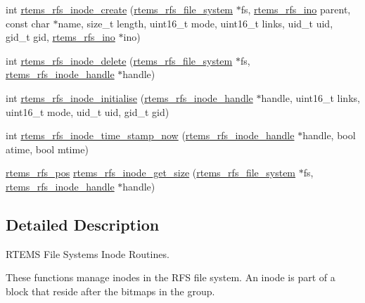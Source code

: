 \begin{DoxyCompactItemize}
\item 
int \mbox{\hyperlink{rtems-rfs-inode_8c_a84fd42caa1f9dada5918fbb1e42c7978}{rtems\+\_\+rfs\+\_\+inode\+\_\+create}} (\mbox{\hyperlink{struct__rtems__rfs__file__system}{rtems\+\_\+rfs\+\_\+file\+\_\+system}} $\ast$fs, \mbox{\hyperlink{rtems-rfs-inode_8h_ae658325c3ff9941f2e68315d20e3c723}{rtems\+\_\+rfs\+\_\+ino}} parent, const char $\ast$name, size\+\_\+t length, uint16\+\_\+t mode, uint16\+\_\+t links, uid\+\_\+t uid, gid\+\_\+t gid, \mbox{\hyperlink{rtems-rfs-inode_8h_ae658325c3ff9941f2e68315d20e3c723}{rtems\+\_\+rfs\+\_\+ino}} $\ast$ino)
\item 
int \mbox{\hyperlink{rtems-rfs-inode_8c_a4630b6fa02927ccf6cbe2205824ccc75}{rtems\+\_\+rfs\+\_\+inode\+\_\+delete}} (\mbox{\hyperlink{struct__rtems__rfs__file__system}{rtems\+\_\+rfs\+\_\+file\+\_\+system}} $\ast$fs, \mbox{\hyperlink{rtems-rfs-inode_8h_a91f02dac5a2d91e072d676f3266ab8d2}{rtems\+\_\+rfs\+\_\+inode\+\_\+handle}} $\ast$handle)
\item 
int \mbox{\hyperlink{rtems-rfs-inode_8c_a7e3f134bbdf115ba538a228ff34a0bce}{rtems\+\_\+rfs\+\_\+inode\+\_\+initialise}} (\mbox{\hyperlink{rtems-rfs-inode_8h_a91f02dac5a2d91e072d676f3266ab8d2}{rtems\+\_\+rfs\+\_\+inode\+\_\+handle}} $\ast$handle, uint16\+\_\+t links, uint16\+\_\+t mode, uid\+\_\+t uid, gid\+\_\+t gid)
\item 
int \mbox{\hyperlink{rtems-rfs-inode_8c_ac67c5e1bc5e79949ac7ed82239c67166}{rtems\+\_\+rfs\+\_\+inode\+\_\+time\+\_\+stamp\+\_\+now}} (\mbox{\hyperlink{rtems-rfs-inode_8h_a91f02dac5a2d91e072d676f3266ab8d2}{rtems\+\_\+rfs\+\_\+inode\+\_\+handle}} $\ast$handle, bool atime, bool mtime)
\item 
\mbox{\hyperlink{rtems-rfs-file-system_8h_ae6adc04fe673c46403605d64f16699bd}{rtems\+\_\+rfs\+\_\+pos}} \mbox{\hyperlink{rtems-rfs-inode_8c_ab72a7a18e25bf5450738de33dfd4c832}{rtems\+\_\+rfs\+\_\+inode\+\_\+get\+\_\+size}} (\mbox{\hyperlink{struct__rtems__rfs__file__system}{rtems\+\_\+rfs\+\_\+file\+\_\+system}} $\ast$fs, \mbox{\hyperlink{rtems-rfs-inode_8h_a91f02dac5a2d91e072d676f3266ab8d2}{rtems\+\_\+rfs\+\_\+inode\+\_\+handle}} $\ast$handle)
\end{DoxyCompactItemize}


\subsection{Detailed Description}
R\+T\+E\+MS File Systems Inode Routines. 

These functions manage inodes in the R\+FS file system. An inode is part of a block that reside after the bitmaps in the group. 

